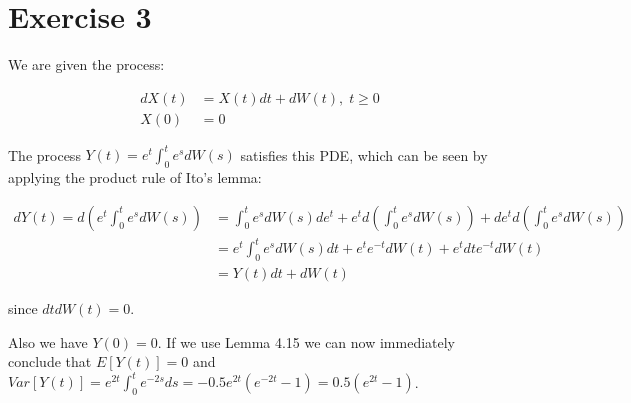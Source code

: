\documentclass[11pt,a4paper,onecolumn]{article}
\begin{document}
\section{Exercise 3}

We are given the process:

\begin{align*}
  dX(t) &= X(t)dt + dW(t), \; t\geq0 \\
  X(0) &= 0
\end{align*}

The process $Y(t) = e^t \int^t_0 e^sdW(s)$ satisfies this PDE, which can be seen by applying the product rule of Ito's lemma:

\begin{align*}
  dY(t) = d\left(e^t \int^t_0 e^sdW(s)\right) &= \int^t_0 e^sdW(s) de^t + e^t d\left(\int^t_0 e^sdW(s)\right) + de^t d\left(\int^t_0 e^sdW(s)\right) \\
   &= e^t \int^t_0 e^sdW(s) dt + e^t e^{-t} dW(t) + e^t dt e^{-t} dW(t)\\
   &= Y(t) dt + dW(t)
\end{align*}

since $dt dW(t) = 0$.

Also we have $Y(0) = 0$. If we use Lemma 4.15 we can now immediately conclude that $E[Y(t)] = 0$ and $Var[Y(t)] = e^{2t} \int^t_0 e^{-2s}ds = -0.5 e^{2t}(e^{-2t} - 1) = 0.5(e^{2t} - 1)$.
\end{document}
